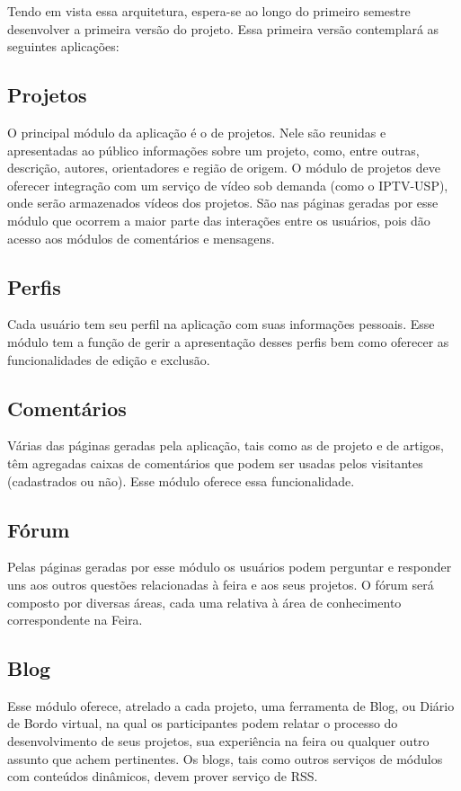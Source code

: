   Tendo em vista essa arquitetura, espera-se ao longo do primeiro semestre desenvolver a primeira versão do projeto. Essa primeira versão contemplará as seguintes aplicações:

  \subsection{Projetos}
    O principal módulo da aplicação é o de projetos. Nele são reunidas e apresentadas ao público informações sobre um projeto, como, entre outras, descrição, autores, orientadores e região de origem. O módulo de projetos deve oferecer integração com um serviço de vídeo sob demanda (como o IPTV-USP), onde serão armazenados vídeos dos projetos. São nas páginas geradas por esse módulo que ocorrem a maior parte das interações entre os usuários, pois dão acesso aos módulos de comentários e mensagens.

  \subsection{Perfis}
    Cada usuário tem seu perfil na aplicação com suas informações pessoais. Esse módulo tem a função de gerir a apresentação desses perfis bem como oferecer as funcionalidades de edição e exclusão.

  \subsection{Comentários}
    Várias das páginas geradas pela aplicação, tais como as de projeto e de artigos, têm agregadas caixas de comentários que podem ser usadas pelos visitantes (cadastrados ou não). Esse módulo oferece essa funcionalidade.

  \subsection{Fórum}
    Pelas páginas geradas por esse módulo os usuários podem perguntar e responder uns aos outros questões relacionadas à feira e aos seus projetos. O fórum será composto por diversas áreas, cada uma relativa à área de conhecimento correspondente na Feira.

  \subsection{Blog}
    Esse módulo oferece, atrelado a cada projeto, uma ferramenta de Blog, ou Diário de Bordo virtual, na qual os participantes podem relatar o processo do desenvolvimento de seus projetos, sua experiência na feira ou qualquer outro assunto que achem pertinentes. Os blogs, tais como outros serviços de módulos com conteúdos dinâmicos, devem prover serviço de RSS.

